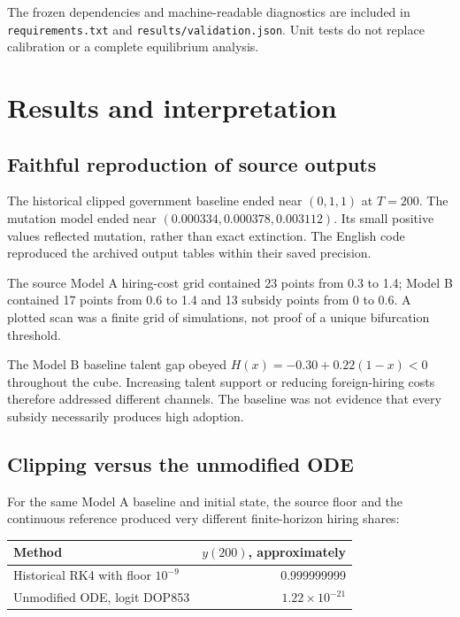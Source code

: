 \documentclass[
  11pt,
  letterpaper,
]{article}
\begin{document}
The frozen dependencies and machine-readable diagnostics are included in
\texttt{requirements.txt} and \texttt{results/validation.json}. Unit
tests do not replace calibration or a complete equilibrium analysis.

\section{Results and interpretation}\label{results-and-interpretation}

\subsection{Faithful reproduction of source
outputs}\label{faithful-reproduction-of-source-outputs}

The historical clipped government baseline ended near \((0,1,1)\) at
\(T=200\). The mutation model ended near
\((0.000334,0.000378,0.003112)\). Its small positive values reflected
mutation, rather than exact extinction. The English code reproduced the
archived output tables within their saved precision.

The source Model A hiring-cost grid contained 23 points from 0.3 to 1.4;
Model B contained 17 points from 0.6 to 1.4 and 13 subsidy points from 0
to 0.6. A plotted scan was a finite grid of simulations, not proof of a
unique bifurcation threshold.

The Model B baseline talent gap obeyed \(H(x)=-0.30+0.22(1-x)<0\)
throughout the cube. Increasing talent support or reducing
foreign-hiring costs therefore addressed different channels. The
baseline was not evidence that every subsidy necessarily produces high
adoption.

\subsection{Clipping versus the unmodified
ODE}\label{clipping-versus-the-unmodified-ode}

For the same Model A baseline and initial state, the source floor and
the continuous reference produced very different finite-horizon hiring
shares:

\begin{longtable}[]{@{}lr@{}}
\toprule\noalign{}
Method & \(y(200)\), approximately \\
\midrule\noalign{}
\endhead
\bottomrule\noalign{}
\endlastfoot
Historical RK4 with floor \(10^{-9}\) & 0.999999999 \\
Unmodified ODE, logit DOP853 & \(1.22\times10^{-21}\) \\
\end{longtable}
\end{document}
